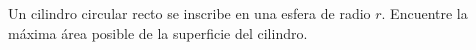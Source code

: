 \item Un cilindro circular recto se inscribe en una esfera de radio $r$. Encuentre la máxima área posible de la superficie del cilindro.
